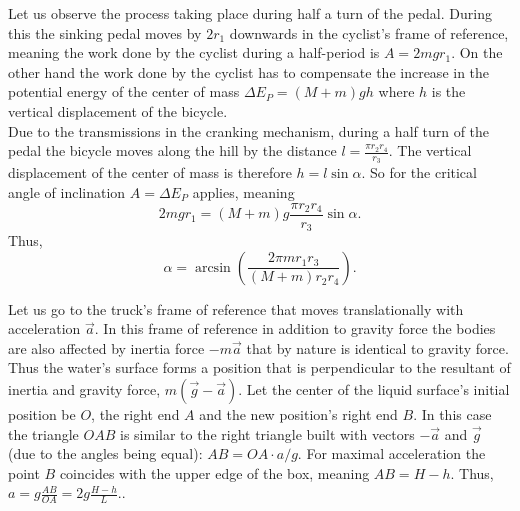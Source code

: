 \documentclass[11pt]{article}
\begin{document}
\solueng
Let us observe the process taking place during half a turn of the pedal. During this the sinking pedal moves by $2r_1$ downwards in the cyclist’s frame of reference, meaning the work done by the cyclist during a half-period is $A = 2mgr_1$. On the other hand the work done by the cyclist has to compensate the increase in the potential energy of the center of mass $\Delta E_P = (M + m)gh$ where $h$ is the vertical displacement of the bicycle.\\
Due to the transmissions in the cranking mechanism, during a half turn of the pedal the bicycle moves along the hill by the distance $l=\frac{\pi r_2 r_4}{r_3}$. The vertical displacement of the center of mass is therefore $h = l\sin\alpha$. So for the critical angle of inclination $A = \Delta E_P$ applies, meaning 
\[
2mgr_1 = (M + m)g\frac{\pi r_2r_4}{r_3}\sin\alpha.
\]
Thus, 
\[
\alpha = \arcsin\left(\frac{2\pi mr_1r_3}{(M + m)r_2r_4}\right).
\]
\probend
\bigskip


\solueng
Let us go to the truck’s frame of reference that moves translationally with acceleration $\vec a$. In this frame of reference in addition to gravity force the bodies are also affected by inertia force $-m\vec a$ that by nature is identical to gravity force. Thus the water’s surface forms a position that is perpendicular to the resultant of inertia and gravity force, $m(\vec g-\vec a)$. Let the center of the liquid surface’s initial position be $O$, the right end $A$ and the new position’s right end $B$. In this case the triangle $OAB$ is similar to the right triangle built with vectors $-\vec a$ and $\vec g$ (due to the angles being equal): $AB=OA\cdot a/g$. For maximal acceleration the point $B$ coincides with the upper edge of the box, meaning $AB=H-h$. Thus, $a=g\frac {AB}{OA}=2g\frac {H-h}{L}.$.
\probend
\bigskip

\end{document}
